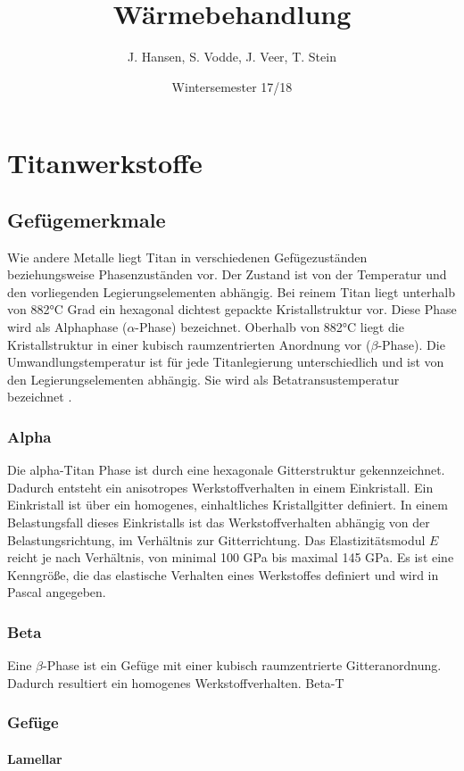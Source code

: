 \documentclass[a4paper, 11pt]{tubsreprt}
\title{Wärmebehandlung}
\date{Wintersemester 17/18}
\author{J. Hansen, S. Vodde,
 J. Veer, T. Stein}
\begin{document}
\maketitle
\tableofcontents
\chapter{Titanwerkstoffe}
\section{Gefügemerkmale}
Wie andere Metalle liegt Titan in verschiedenen Gefügezuständen beziehungsweise Phasenzuständen vor. Der Zustand ist von der Temperatur und den vorliegenden Legierungselementen abhängig. Bei reinem Titan liegt unterhalb von 882°C Grad ein hexagonal dichtest gepackte Kristallstruktur vor. Diese Phase wird als Alphaphase ($\alpha$-Phase) bezeichnet. Oberhalb von 882°C liegt die Kristallstruktur in einer kubisch raumzentrierten Anordnung vor ($\beta$-Phase). Die Umwandlungstemperatur ist für jede Titanlegierung unterschiedlich und ist von den Legierungselementen abhängig. Sie wird als Betatransustemperatur bezeichnet \cite{Luetjering2007}.

\subsection{Alpha}
Die alpha-Titan Phase ist durch eine hexagonale Gitterstruktur gekennzeichnet. Dadurch entsteht ein anisotropes Werkstoffverhalten in einem Einkristall.
Ein Einkristall ist über ein homogenes, einhaltliches Kristallgitter definiert.
In einem Belastungsfall dieses Einkristalls ist das Werkstoffverhalten abhängig von der Belastungsrichtung, im Verhältnis zur Gitterrichtung. Das Elastizitätsmodul $E$ reicht je nach Verhältnis, von minimal 100 GPa bis maximal 145 GPa. Es ist eine Kenngröße, die das elastische Verhalten eines Werkstoffes definiert und wird in Pascal angegeben. 

\subsection{Beta}
Eine $\beta$-Phase ist ein Gefüge mit einer kubisch raumzentrierte Gitteranordnung. Dadurch resultiert ein homogenes Werkstoffverhalten.
Beta-T  
\subsection{Gefüge}
\subsubsection{Lamellar}
\end{document}
